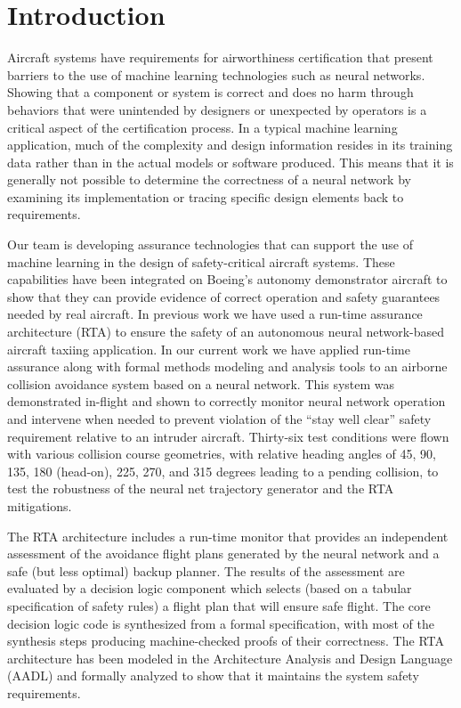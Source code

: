 \section{Introduction}

Aircraft systems have requirements for airworthiness certification that present barriers to the use
of machine learning technologies such as neural networks. Showing that a component or system is
correct and does no harm through behaviors that were unintended by designers or unexpected by
operators is a critical aspect of the certification process. In a typical machine learning
application, much of the complexity and design information resides in its training data rather than
in the actual models or software produced. This means that it is generally not possible to determine
the correctness of a neural network by examining its implementation or tracing specific design
elements back to requirements.

Our team is developing assurance technologies that can support the use of machine learning in the
design of safety-critical aircraft systems. These capabilities have been integrated on Boeing’s
autonomy demonstrator aircraft to show that they can provide evidence of correct operation and
safety guarantees needed by real aircraft. In previous work \cite{dasc2020} we have used a run-time assurance
architecture (RTA) to ensure the safety of an autonomous neural network-based aircraft taxiing
application. In our current work we have applied run-time assurance along with formal methods
modeling and analysis tools to an airborne collision avoidance system based on a neural network.
This system was demonstrated in-flight and shown to correctly monitor neural network operation and
intervene when needed to prevent violation of the “stay well clear” safety requirement relative to
an intruder aircraft. Thirty-six test conditions were flown with various collision course
geometries, with relative heading angles of 45, 90, 135, 180 (head-on), 225, 270, and 315 degrees
leading to a pending collision, to test the robustness of the neural net trajectory generator and
the RTA mitigations.

The RTA architecture includes a run-time monitor that provides an independent assessment of the
avoidance flight plans generated by the neural network and a safe (but less optimal) backup planner.
The results of the assessment are evaluated by a decision logic component which selects (based on a
tabular specification of safety rules) a flight plan that will ensure safe flight. The core decision
logic code is synthesized from a formal specification, with most of the synthesis steps producing
machine-checked proofs of their correctness. The RTA architecture has been modeled in the
Architecture Analysis and Design Language (AADL) and formally analyzed to show that it maintains the
system safety requirements.

